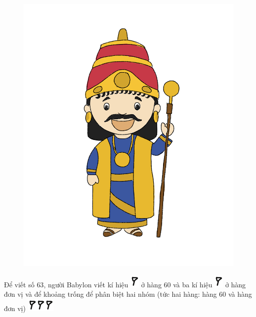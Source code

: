 		\begin{figure}
		\centering
		\vspace*{-15pt}
		\captionsetup{labelformat= empty, justification=centering}
		\includegraphics[width=1\linewidth]{20.12-pi.2}
		\vspace*{-25pt}
	\end{figure}
	Để viết số $63$, người Babylon viết kí hiệu  \includegraphics[scale=0.85]{15}  ở hàng $60$ và ba kí hiệu \includegraphics[scale=0.85]{15}  ở hàng đơn vị và để khoảng trống để phân biệt hai nhóm (tức hai hàng: hàng $60$ và hàng đơn vị) \includegraphics[scale=0.85]{15}\includegraphics[scale=0.85]{15}\includegraphics[scale=0.85]{15}

